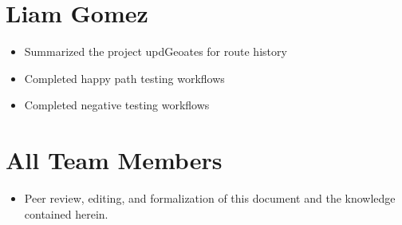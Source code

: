 \documentclass{scrreprt}
\begin{document}
	\section{Liam Gomez}
		\begin{itemize}
			\item Summarized the project updGeoates for route history
			\item Completed happy path testing workflows
			\item Completed negative testing workflows
		\end{itemize}
	\section{All Team Members}
		\begin{itemize}
			\item Peer review, editing, and formalization of this document and the knowledge contained herein.
		\end{itemize}
\end{document}
